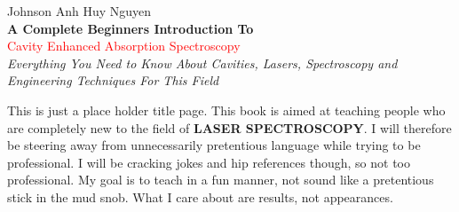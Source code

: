 %
%
%
% 
%

\begin{titlepage}
\newenvironment{bottompar}{\par\vspace*{\fill}}{\clearpage}

\raggedleft %
\vspace*{\baselineskip} %

{\Large Johnson Anh Huy Nguyen}\\[0.167\textheight] %

{\LARGE\bfseries A Complete Beginners Introduction To}\\[\baselineskip] %

{\textcolor{Red}{\Huge Cavity Enhanced Absorption Spectroscopy}}\\[\baselineskip] %

{\Large \textit{Everything You Need to Know About Cavities, Lasers, Spectroscopy and Engineering Techniques For This Field}}\par %

\vfill %

\vspace*{3\baselineskip} %
\flushleft
This is just a place holder title page. This book is aimed at teaching people who are completely new to the field of {\bfseries{LASER SPECTROSCOPY}}. I will therefore be steering away from unnecessarily pretentious language while trying to be professional. I will be cracking jokes and hip references though, so not too professional. My goal is to teach in a fun manner, not sound like a pretentious stick in the mud snob. What I care about are results, not appearances.
\end{titlepage}

